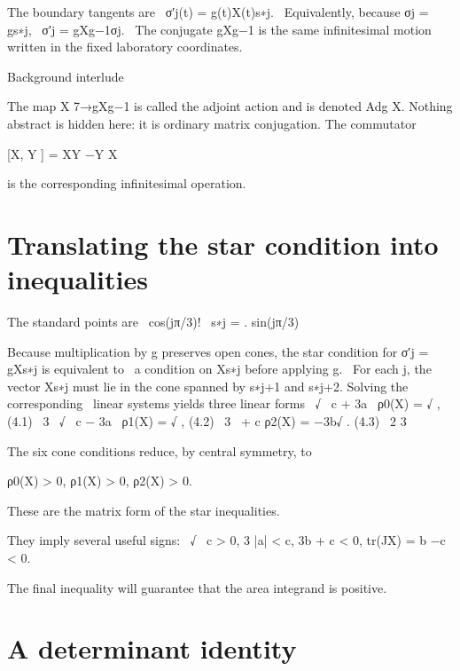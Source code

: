 \begin{displaytext}
The boundary tangents are \
σ′j(t) = g(t)X(t)s∗j. \
Equivalently, because σj = gs∗j, \
σ′j = gXg−1σj. \
The conjugate gXg−1 is the same infinitesimal motion written in the fixed laboratory coordinates.
\end{displaytext}

Background interlude


The map X 7→gXg−1 is called the adjoint action and is denoted Adg X. Nothing abstract is hidden here: it is ordinary matrix conjugation. The commutator


[X, Y ] = XY −Y X


is the corresponding infinitesimal operation.


\section{Translating the star condition into inequalities}

\begin{displaytext}
The standard points are \
cos(jπ/3)! \
s∗j = . sin(jπ/3)
\end{displaytext}

\begin{displaytext}
Because multiplication by g preserves open cones, the star condition for σ′j = gXs∗j is equivalent to \
a condition on Xs∗j before applying g. \
For each j, the vector Xs∗j must lie in the cone spanned by s∗j+1 and s∗j+2. Solving the corresponding \
linear systems yields three linear forms \
√ \
c + 3a \
ρ0(X) = √ , (4.1) \
3 \
√ \
c − 3a \
ρ1(X) = √ , (4.2) \
3 \
+ c ρ2(X) = −3b√ . (4.3) \
2 3
\end{displaytext}

The six cone conditions reduce, by central symmetry, to


\begin{displaytext}
ρ0(X) > 0, ρ1(X) > 0, ρ2(X) > 0.
\end{displaytext}

These are the matrix form of the star inequalities.


\begin{displaytext}
They imply several useful signs: \
√ \
c > 0, 3 |a| < c, 3b + c < 0, tr(JX) = b −c < 0.
\end{displaytext}

The final inequality will guarantee that the area integrand is positive.


\section{A determinant identity}

